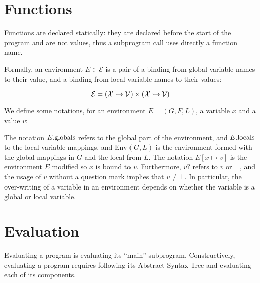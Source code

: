 \documentclass{book}
\begin{document}
\section{Functions}
Functions are declared statically: they are declared before the start of the
program and are not values, thus a subprogram call uses directly a function name. 

Formally, an environment $E \in \mathcal{E}$ is a pair of a binding from global
variable names to their value, and a binding from local variable names to their
values:

%
\[
  \mathcal{E} = \left( \mathcal{X} \hookrightarrow \mathcal{V} \right)
         \times \left( \mathcal{X} \hookrightarrow \mathcal{V} \right)
\]

We define some notations, for an environment $E = (G, F, L)$, a variable $x$
and a value $v$:
%
%
The notation $E.\text{globals}$ refers to the global part of the environment, and
$E.\text{locals}$ to the local variable mappings, and $\text{Env} (G, L)$ is the
environment formed with the global mappings in $G$ and the local from $L$.
%
The notation $E[x \mapsto v]$ is the environment $E$ modified so $x$ is bound
to $v$.
%
Furthermore, $v?$ refers to $v$ or $\bot$, and the usage of $v$ without a
question mark implies that $v \neq \bot$.
%
In particular, the over-writing of a variable in an environment depends on
whether the variable is a global or local variable.

\section{Evaluation}

Evaluating a program is evaluating its ``main'' subprogram.
Constructively, evaluating a program requires following its
Abstract Syntax Tree and evaluating each of its components.
\end{document}
